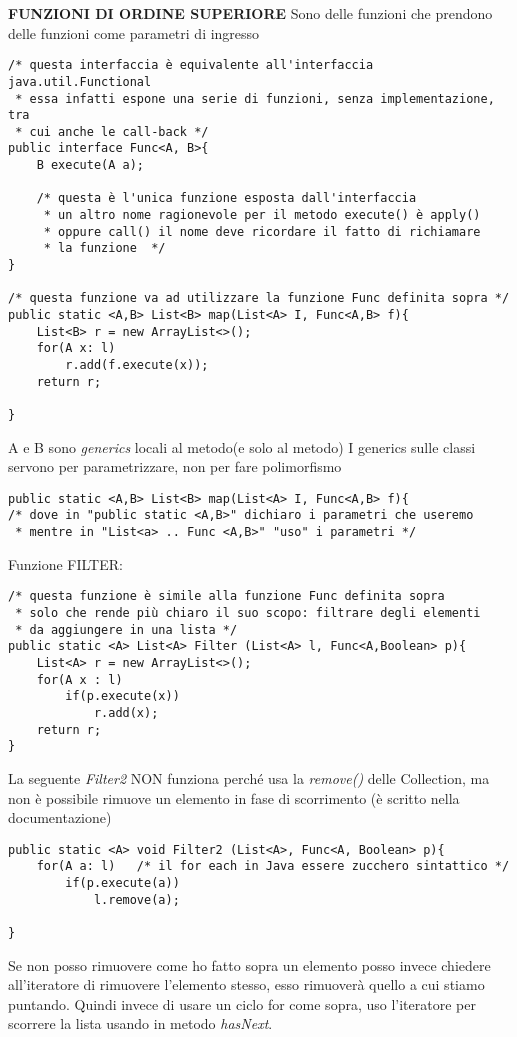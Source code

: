 \noindent \textbf{FUNZIONI DI ORDINE SUPERIORE} \newline
Sono delle funzioni che prendono delle funzioni come parametri di ingresso 
\begin{lstlisting}[basicstyle=\small,]
/* questa interfaccia è equivalente all'interfaccia java.util.Functional
 * essa infatti espone una serie di funzioni, senza implementazione, tra 
 * cui anche le call-back */
public interface Func<A, B>{
	B execute(A a); 
	
	/* questa è l'unica funzione esposta dall'interfaccia
	 * un altro nome ragionevole per il metodo execute() è apply() 
	 * oppure call() il nome deve ricordare il fatto di richiamare 
	 * la funzione  */
}

/* questa funzione va ad utilizzare la funzione Func definita sopra */
public static <A,B> List<B> map(List<A> I, Func<A,B> f){
	List<B> r = new ArrayList<>();
	for(A x: l)
		r.add(f.execute(x));
	return r;

}
\end{lstlisting}
A e B sono \textit{generics} locali al metodo(e solo al metodo) \newline
I generics sulle classi servono per parametrizzare, non per fare polimorfismo \newline
\begin{lstlisting}[basicstyle=\small,]
public static <A,B> List<B> map(List<A> I, Func<A,B> f){
/* dove in "public static <A,B>" dichiaro i parametri che useremo
 * mentre in "List<a> .. Func <A,B>" "uso" i parametri */
\end{lstlisting}

\noindent Funzione FILTER: 
\begin{lstlisting}[basicstyle=\small,]
/* questa funzione è simile alla funzione Func definita sopra
 * solo che rende più chiaro il suo scopo: filtrare degli elementi
 * da aggiungere in una lista */
public static <A> List<A> Filter (List<A> l, Func<A,Boolean> p){
	List<A> r = new ArrayList<>();
	for(A x : l)
		if(p.execute(x))
			r.add(x);
	return r;
}
\end{lstlisting}

\noindent La seguente \textit{Filter2} NON funziona perché usa la \textit{remove()} delle Collection, ma non è possibile rimuove un elemento in fase di scorrimento (è scritto nella documentazione)

\begin{lstlisting}[basicstyle=\small,]
public static <A> void Filter2 (List<A>, Func<A, Boolean> p){
	for(A a: l)   /* il for each in Java essere zucchero sintattico */
		if(p.execute(a))
			l.remove(a);

}
\end{lstlisting}
Se non posso rimuovere come ho fatto sopra un elemento posso invece chiedere all'iteratore di rimuovere l'elemento stesso, esso rimuoverà quello a cui stiamo puntando. Quindi invece di usare un ciclo for come sopra, uso l'iteratore per scorrere la lista usando in metodo \textit{hasNext}.

